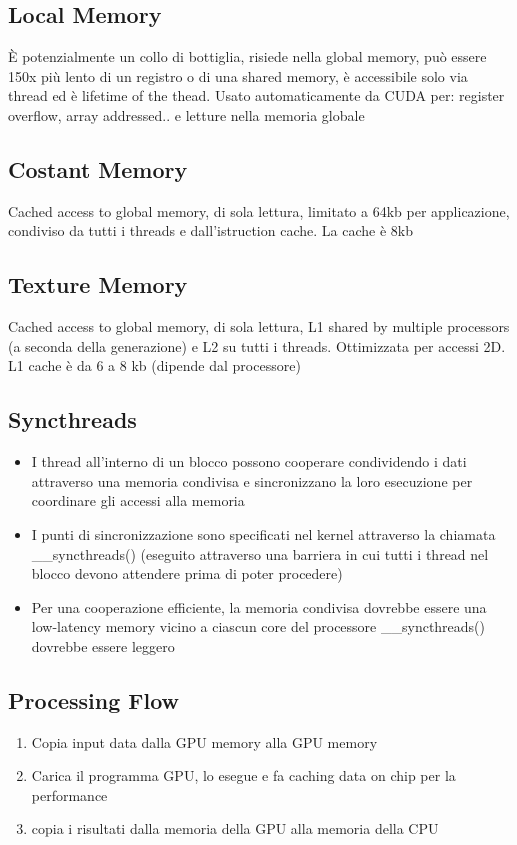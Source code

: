 \documentclass[8pt,a4paper]{article}
\begin{document}
\begin{multicols}{5}
    \subsection{Local Memory}
    È potenzialmente un collo di bottiglia, risiede nella global memory, può essere 150x più lento 
    di un registro o di una shared memory, è accessibile solo via thread ed è lifetime of the thead. 
    {\color{red}Usato automaticamente da CUDA per:} register overflow, array addressed.. 
    e letture nella memoria globale
    
    \subsection{Costant Memory}
    Cached access to global memory, di sola lettura, limitato a 64kb per applicazione, condiviso 
    da tutti i threads e dall’istruction cache. La  cache è 8kb
    
    \subsection{Texture Memory}
    Cached access to global memory, di sola lettura, L1 shared by multiple processors 
    (a seconda della generazione) e L2 su tutti i threads. Ottimizzata per accessi 2D. 
    L1 cache è da 6 a 8 kb (dipende dal processore)
    
    \subsection{Syncthreads}
    \begin{itemize}
        \item I thread all'interno di un blocco possono cooperare condividendo i dati attraverso 
        una memoria condivisa e sincronizzano la loro esecuzione per coordinare gli accessi alla memoria
        \item I punti di sincronizzazione sono specificati nel kernel attraverso la chiamata 
        {\color{red}\_\_syncthreads()} (eseguito attraverso una  barriera in cui tutti i thread nel blocco devono 
        attendere prima di poter procedere)
        \item Per una cooperazione efficiente, la memoria condivisa dovrebbe essere una low-latency 
        memory vicino a ciascun core del processore {\color{red}\_\_syncthreads()} dovrebbe essere leggero
    \end{itemize}
    
    \subsection{Processing Flow}
    \begin{enumerate}
        \item Copia input data dalla GPU memory alla GPU memory
        \item Carica il programma GPU, lo esegue e fa caching data on chip per la performance
        \item copia i risultati dalla memoria della GPU alla memoria della CPU
    \end{enumerate}




\end{multicols}
\end{document}
